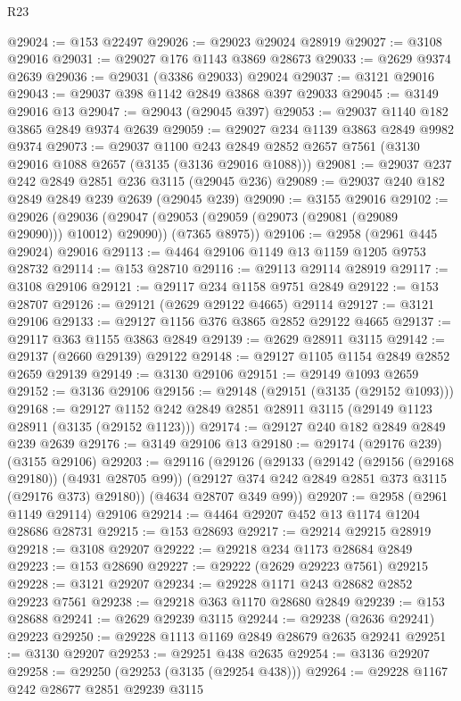 \begin{lexlean}{R23}
\begin{coremodule}
@29024 := @153 @22497
@29026 := @29023 @29024 @28919
@29027 := @3108 @29016
@29031 := @29027 @176 @1143 @3869 @28673
@29033 := @2629 @9374 @2639
@29036 := @29031 (@3386 @29033) @29024
@29037 := @3121 @29016
@29043 := @29037 @398 @1142 @2849 @3868 @397 @29033
@29045 := @3149 @29016 @13
@29047 := @29043 (@29045 @397)
@29053 := @29037 @1140 @182 @3865 @2849 @9374 @2639
@29059 := @29027 @234 @1139 @3863 @2849 @9982 @9374
@29073 := @29037
    @1100
    @243
    @2849
    @2852
    @2657
    @7561
    (@3130 @29016 @1088 @2657 (@3135 (@3136 @29016 @1088)))
@29081 := @29037 @237 @242 @2849 @2851 @236 @3115 (@29045 @236)
@29089 := @29037 @240 @182 @2849 @2849 @239 @2639 (@29045 @239)
@29090 := @3155 @29016
@29102 := @29026
    (@29036
      (@29047 (@29053 (@29059 (@29073 (@29081 (@29089 @29090))) @10012) @29090))
      (@7365 @8975))
@29106 := @2958 (@2961 @445 @29024) @29016
@29113 := @4464 @29106 @1149 @13 @1159 @1205 @9753 @28732
@29114 := @153 @28710
@29116 := @29113 @29114 @28919
@29117 := @3108 @29106
@29121 := @29117 @234 @1158 @9751 @2849
@29122 := @153 @28707
@29126 := @29121 (@2629 @29122 @4665) @29114
@29127 := @3121 @29106
@29133 := @29127 @1156 @376 @3865 @2852 @29122 @4665
@29137 := @29117 @363 @1155 @3863 @2849
@29139 := @2629 @28911 @3115
@29142 := @29137 (@2660 @29139) @29122
@29148 := @29127 @1105 @1154 @2849 @2852 @2659 @29139
@29149 := @3130 @29106
@29151 := @29149 @1093 @2659
@29152 := @3136 @29106
@29156 := @29148 (@29151 (@3135 (@29152 @1093)))
@29168 := @29127 @1152 @242 @2849 @2851 @28911 @3115 (@29149 @1123 @28911 (@3135 (@29152 @1123)))
@29174 := @29127 @240 @182 @2849 @2849 @239 @2639
@29176 := @3149 @29106 @13
@29180 := @29174 (@29176 @239) (@3155 @29106)
@29203 := @29116
    (@29126
      (@29133
        (@29142 (@29156 (@29168 @29180)) (@4931 @28705 @99))
        (@29127 @374 @242 @2849 @2851 @373 @3115 (@29176 @373) @29180))
      (@4634 @28707 @349 @99))
@29207 := @2958 (@2961 @1149 @29114) @29106
@29214 := @4464 @29207 @452 @13 @1174 @1204 @28686 @28731
@29215 := @153 @28693
@29217 := @29214 @29215 @28919
@29218 := @3108 @29207
@29222 := @29218 @234 @1173 @28684 @2849
@29223 := @153 @28690
@29227 := @29222 (@2629 @29223 @7561) @29215
@29228 := @3121 @29207
@29234 := @29228 @1171 @243 @28682 @2852 @29223 @7561
@29238 := @29218 @363 @1170 @28680 @2849
@29239 := @153 @28688
@29241 := @2629 @29239 @3115
@29244 := @29238 (@2636 @29241) @29223
@29250 := @29228 @1113 @1169 @2849 @28679 @2635 @29241
@29251 := @3130 @29207
@29253 := @29251 @438 @2635
@29254 := @3136 @29207
@29258 := @29250 (@29253 (@3135 (@29254 @438)))
@29264 := @29228 @1167 @242 @28677 @2851 @29239 @3115

\end{coremodule}
\end{lexlean}
